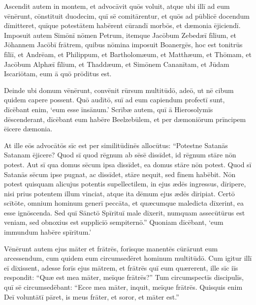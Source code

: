 \Versus Ascendit autem in montem, et advocāvit quōs voluit, atque ubi illī ad eum vēnērunt,
\Versus cōnstituit duodecim, quī sē comitārentur, et quōs ad pūblicē docendum dīmitteret,
\Versus quīque potestātem habērent cūrandī morbōs, et dæmonia ējiciendī.
\Versus Imposuit autem Simōnī nōmen Petrum,
\Versus itemque Jacōbum Zebedæī fīlium, et Jōhannem Jacōbī frātrem, quibus nōmina imposuit Boanergēs, hoc est tonitrūs fīliī,
\Versus et Andrēam, et Philippum, et Bartholomæum, et Matthæum, et Thōmam, et Jacōbum Alphæī fīlium, et Thaddæum, et Simōnem Cananītam,
\Versus et Jūdam Iscariōtam, eum ā quō prōditus est.

\Versus Deinde ubi domum vēnērunt, convēnit rūrsum multitūdō, adeō, ut nē cibum quidem capere possent.
\Versus Quō audītō, suī ad eum capiendum profectī sunt, dīcēbant enim, `eum esse īnsānum.'
\Versus Scrībæ autem, quī ā Hierosolymīs dēscenderant, dīcēbant eum habēre Beelzebūlem, et per dæmoniōrum prīncipem ēicere dæmonia.

\Versus At ille eōs advocātōs sīc est per similitūdinēs allocūtus: ``Potestne Satanās Satanam ējicere?
\Versus Quod sī quod rēgnum ab sēsē dissīdet, id rēgnum stāre nōn potest.
\Versus Aut sī qua domus sēcum ipsa dissīdet, ea domus stāre nōn potest.
\Versus Quod sī Satanās sēcum ipse pugnat, ac dissīdet, stāre nequit, sed fīnem habēbit.
\Versus Nōn potest quisquam alicujus potentis supellectilem, in ejus ædēs ingressus, dīripere, nisi prius potentem illum vinciat, atque ita dēmum ejus ædēs dīripiat.
\Versus Certō scītōte, omnium hominum generī peccāta, et quæcumque maledicta dīxerint, ea esse ignōscenda.
\Versus Sed quī Sānctō Spīrituī male dīxerit, numquam assecūtūrus est veniam, sed obnoxius est suppliciō sempiternō.''
\Versus Quoniam dīcēbant, `eum immundum habēre spīritum.'

\Versus Vēnērunt autem ejus māter et frātrēs, forīsque manentēs cūrārunt eum arcessendum,
\Versus cum quidem eum circumsedēret hominum multitūdō. Cum igitur illī eī dīxissent, adesse forīs ejus mātrem, et frātrēs quī eum quærerent,
\Versus ille sīc iīs respondit: ``Quæ est mea māter, meīque frātrēs?''
\Versus Tum circumspectīs discipulīs, quī sē circumsedēbant: ``Ecce mea māter, inquit, meīque frātrēs.
\Versus Quisquis enim Deī voluntātī pāret, is meus frāter, et soror, et māter est.''



